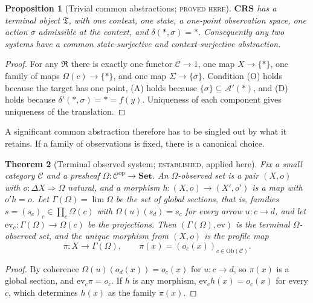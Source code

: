 \documentclass[11pt]{article}
\newtheorem{theorem}{Theorem}[section]
\newtheorem{proposition}[theorem]{Proposition}
\theoremstyle{definition}
\theoremstyle{remark}
\newcommand{\stE}{\textsc{established}}
\newcommand{\stN}{\textsc{proved here}}
\newcommand{\cC}{\mathcal C}
\newcommand{\cA}{\mathcal A}
\newcommand{\fR}{\mathfrak R}
\newcommand{\fT}{\mathfrak T}
\newcommand{\Set}{\mathbf{Set}}
\newcommand{\CRS}{\mathbf{CRS}}
\newcommand{\op}{\mathrm{op}}
\newcommand{\Ob}{\mathrm{Ob}}
\begin{document}
\begin{proposition}[Trivial common abstractions; \stN]\label{prop:trivialabs}
$\CRS$ has a terminal object $\fT$, with one context, one state, a one-point observation space, one action $\sigma$ admissible at the context, and $\delta(\ast,\sigma)=\ast$. Consequently any two systems have a common state-surjective and context-surjective abstraction.
\end{proposition}
\begin{proof}
For any $\fR$ there is exactly one functor $\cC\to1$, one map $X\to\{\ast\}$, one family of maps $\Omega(c)\to\{\ast\}$, and one map $\Sigma\to\{\sigma\}$. Condition (O) holds because the target has one point, (A) holds because $\{\sigma\}\subseteq\cA'(\ast)$, and (D) holds because $\delta'(\ast,\sigma)=\ast=f(y)$. Uniqueness of each component gives uniqueness of the translation.
\end{proof}

A significant common abstraction therefore has to be singled out by what it retains. If a family of observations is fixed, there is a canonical choice.

\begin{theorem}[Terminal observed system; \stE, applied here]\label{thm:terminalobs}
Fix a small category $\cC$ and a presheaf $\Omega:\cC^{\op}\to\Set$. An \emph{$\Omega$-observed set} is a pair $(X,o)$ with $o:\Delta X\Rightarrow\Omega$ natural, and a morphism $h:(X,o)\to(X',o')$ is a map with $o'h=o$. Let $\Gamma(\Omega)=\lim\Omega$ be the set of global sections, that is, families $s=(s_c)_c\in\prod_c\Omega(c)$ with $\Omega(u)(s_d)=s_c$ for every arrow $u:c\to d$, and let $\mathrm{ev}_c:\Gamma(\Omega)\to\Omega(c)$ be the projections. Then $(\Gamma(\Omega),\mathrm{ev})$ is the terminal $\Omega$-observed set, and the unique morphism from $(X,o)$ is the \emph{profile map}
\[
\pi:X\to\Gamma(\Omega),\qquad\pi(x)=(o_c(x))_{c\in\Ob(\cC)}.
\]
\end{theorem}
\begin{proof}
By coherence $\Omega(u)(o_d(x))=o_c(x)$ for $u:c\to d$, so $\pi(x)$ is a global section, and $\mathrm{ev}_c\pi=o_c$. If $h$ is any morphism, $\mathrm{ev}_ch(x)=o_c(x)$ for every $c$, which determines $h(x)$ as the family $\pi(x)$.
\end{proof}
\end{document}

